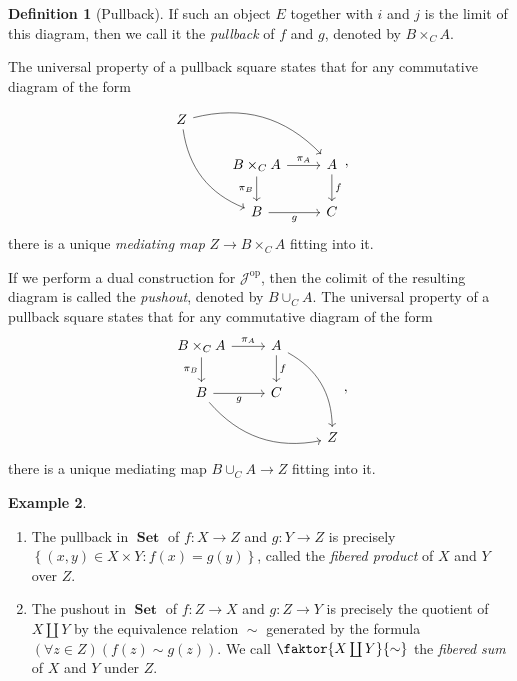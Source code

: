 \documentclass[10pt,letterpaper,cm]{nupset}
\theoremstyle{definition}
\newtheorem{definition}{Definition}[section]
\newtheorem{exmp}[definition]{Example}
\theoremstyle{theorem}
\theoremstyle{remark}
\newcommand{\1}{\mathbf{1}}
\renewcommand{\j}{\mathscr{J}}
\newcommand{\0}{\vec 0}
\DeclareMathOperator{\op}{op}
\DeclareMathOperator{\set}{\mathbf{Set}}
\begin{document}
\begin{definition}[Pullback]
If such an object $E$ together with $i$ and $j$ is the limit of this diagram, then we call it the \textit{pullback} of $f$ and $g$, denoted by $B \times_{C} A$.

\smallskip

The universal property of a pullback square states that for any commutative diagram of the form
\[
\begin{tikzcd}
Z \arrow[rdd, bend right] \arrow[rrd, bend left] &                                                   &                  \\
                                                 & B\times_CA \arrow[d, "\pi_B"'] \arrow[r, "\pi_A"] & A \arrow[d, "f"] \\
                                                 & B \arrow[r, "g"']                                 & C               
\end{tikzcd},
\] there is a unique \textit{mediating map} $ Z \to B\times_CA$ fitting into it.
\end{definition}


If we perform a dual construction for $\j^{\op}$, then the colimit of the resulting diagram is called the \textit{pushout}, denoted by $B \cup_{C} A$. The universal property of a pullback square states that for any commutative diagram of the form
\[
\begin{tikzcd}
B\times_CA \arrow[d, "\pi_B"'] \arrow[r, "\pi_A"] & A \arrow[d, "f"] \arrow[rdd, bend left] &   \\
B \arrow[r, "g"'] \arrow[rrd, bend right]         & C                                       &   \\
                                                  &                                         & Z
\end{tikzcd},
\] there is a unique mediating map $ B\cup_CA\to Z$ fitting into it.


\begin{exmp} $ $
\begin{enumerate}
\item The pullback in $\set$ of $f: X \to Z$ and $g: Y \to Z$ is precisely $\left\{\left(x,y\right) \in X \times Y : f(x) = g(y)\right\}$, called the \textit{fibered product} of $X$ and $Y$ over $Z$.
\item The pushout in $\set$ of $f: Z \to X$ and $g: Z \to Y$  is precisely the quotient of $X \coprod Y$ by the equivalence relation ${}\sim{}$ generated by the formula $\left(\forall{z\in Z}\right)\left(f(z) \sim g(z)\right)$. We call $\faktor{X \coprod Y}{\sim}$  the \textit{fibered sum} of $X$ and $Y$ under $Z$.
\end{enumerate}
\end{exmp}
\end{document}
